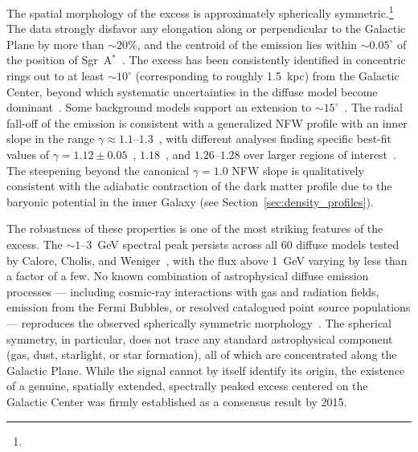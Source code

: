 The spatial morphology of the excess is approximately spherically symmetric.\footnote{}
The data strongly disfavor any elongation along or perpendicular to the Galactic Plane by more than $\sim 20\%$, and the centroid of the emission lies within $\sim 0.05^\circ$ of the position of Sgr~A$^*$~\cite{Daylan:2014rsa}.
The excess has been consistently identified in concentric rings out to at least $\sim 10^\circ$ (corresponding to roughly 1.5~kpc) from the Galactic Center, beyond which systematic uncertainties in the diffuse model become dominant~\cite{Daylan:2014rsa,Calore:2014xka}.
Some background models support an extension to $\sim 15^\circ$~\cite{Calore:2014xka}.
The radial fall-off of the emission is consistent with a generalized NFW profile with an inner slope in the range $\gamma \approx 1.1$--$1.3$~\cite{Daylan:2014rsa,Abazajian:2012pn,Abazajian:2014fta,Calore:2014xka}, with different analyses finding specific best-fit values of $\gamma = 1.12 \pm 0.05$~\cite{Abazajian:2014fta}, $1.18$~\cite{Daylan:2014rsa}, and $1.26$--$1.28$ over larger regions of interest~\cite{Daylan:2014rsa}.
The steepening beyond the canonical $\gamma = 1.0$ NFW slope is qualitatively consistent with the adiabatic contraction of the dark matter profile due to the baryonic potential in the inner Galaxy (see Section~\ref{sec:density_profiles}).

The robustness of these properties is one of the most striking features of the excess.
The $\sim 1$--$3$~GeV spectral peak persists across all 60 diffuse models tested by Calore, Cholis, and Weniger~\cite{Calore:2014xka}, with the flux above 1~GeV varying by less than a factor of a few.
No known combination of astrophysical diffuse emission processes --- including cosmic-ray interactions with gas and radiation fields, emission from the Fermi Bubbles, or resolved catalogued point source populations --- reproduces the observed spherically symmetric morphology~\cite{Daylan:2014rsa}.
The spherical symmetry, in particular, does not trace any standard astrophysical component (gas, dust, starlight, or star formation), all of which are concentrated along the Galactic Plane.
While the signal cannot by itself identify its origin, the existence of a genuine, spatially extended, spectrally peaked excess centered on the Galactic Center was firmly established as a consensus result by 2015.

